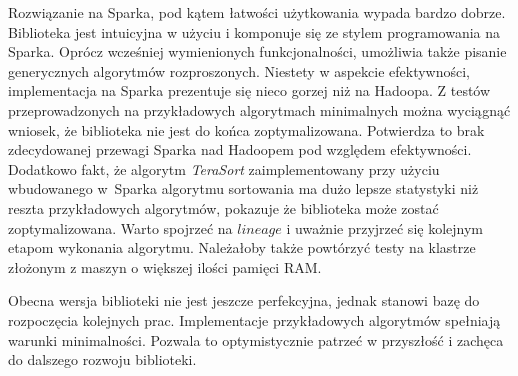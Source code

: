 \documentclass[magisterska]{pracamgr}
\begin{document}
Rozwiązanie na Sparka, pod kątem łatwości użytkowania wypada bardzo dobrze. Biblioteka jest intuicyjna w użyciu i komponuje się ze stylem programowania na Sparka. Oprócz wcześniej wymienionych funkcjonalności, umożliwia także pisanie generycznych algorytmów rozproszonych. Niestety w aspekcie efektywności, implementacja na Sparka prezentuje się nieco gorzej niż na Hadoopa. Z testów przeprowadzonych na przykładowych algorytmach minimalnych można wyciągnąć wniosek, że biblioteka nie jest do końca zoptymalizowana. Potwierdza to brak zdecydowanej przewagi Sparka nad Hadoopem pod względem efektywności. Dodatkowo fakt, że algorytm \textit{TeraSort} zaimplementowany przy użyciu wbudowanego w~Sparka algorytmu sortowania ma dużo lepsze statystyki niż reszta przykładowych algorytmów, pokazuje że biblioteka może zostać zoptymalizowana. Warto spojrzeć na \(lineage\) i uważnie przyjrzeć się kolejnym etapom wykonania algorytmu. Należałoby także powtórzyć testy na klastrze złożonym z maszyn o większej ilości pamięci RAM.

Obecna wersja biblioteki nie jest jeszcze perfekcyjna, jednak stanowi bazę do rozpoczęcia kolejnych prac. Implementacje przykładowych algorytmów spełniają warunki minimalności. Pozwala to optymistycznie patrzeć w przyszłość i zachęca do dalszego rozwoju biblioteki.



\end{document}
